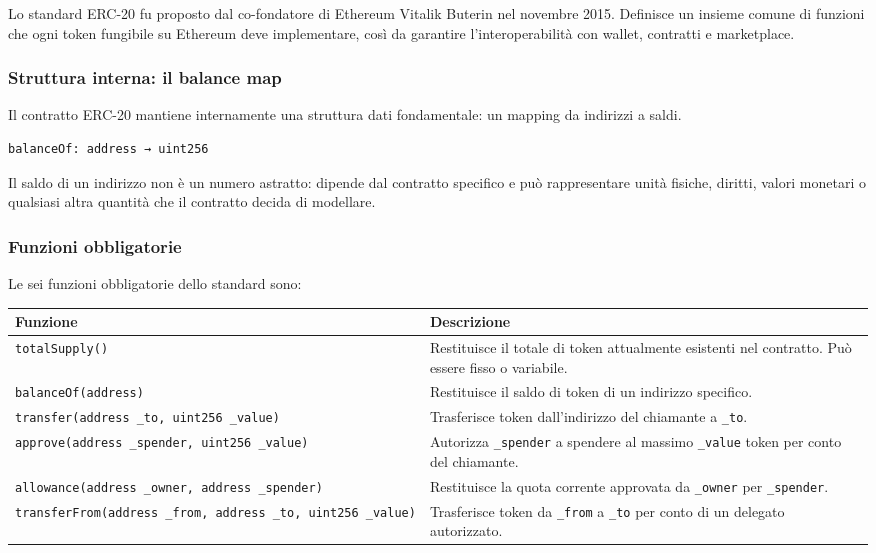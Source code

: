 \documentclass[
  italian,
  openany]{book}
\newcounter{none} %
\begin{document}
Lo standard ERC-20 fu proposto dal co-fondatore di Ethereum Vitalik
Buterin nel novembre 2015. Definisce un insieme comune di funzioni che
ogni token fungibile su Ethereum deve implementare, così da garantire
l'interoperabilità con wallet, contratti e marketplace.

\subsubsection{Struttura interna: il balance
map}\label{struttura-interna-il-balance-map}

Il contratto ERC-20 mantiene internamente una struttura dati
fondamentale: un mapping da indirizzi a saldi.

\begin{verbatim}
balanceOf: address → uint256
\end{verbatim}

Il saldo di un indirizzo non è un numero astratto: dipende dal contratto
specifico e può rappresentare unità fisiche, diritti, valori monetari o
qualsiasi altra quantità che il contratto decida di modellare.

\subsubsection{Funzioni obbligatorie}\label{funzioni-obbligatorie}

Le sei funzioni obbligatorie dello standard sono:

{\def\LTcaptype{none} %
\begin{longtable}[]{@{}
  >{\raggedright\arraybackslash}p{}
  >{\raggedright\arraybackslash}p{}@{}}
\toprule\noalign{}
\begin{minipage}[b]{\linewidth}\raggedright
Funzione
\end{minipage} & \begin{minipage}[b]{\linewidth}\raggedright
Descrizione
\end{minipage} \\
\midrule\noalign{}
\endhead
\bottomrule\noalign{}
\endlastfoot
\texttt{totalSupply()} & Restituisce il totale di token attualmente
esistenti nel contratto. Può essere fisso o variabile. \\
\texttt{balanceOf(address)} & Restituisce il saldo di token di un
indirizzo specifico. \\
\texttt{transfer(address\ \_to,\ uint256\ \_value)} & Trasferisce token
dall'indirizzo del chiamante a \texttt{\_to}. \\
\texttt{approve(address\ \_spender,\ uint256\ \_value)} & Autorizza
\texttt{\_spender} a spendere al massimo \texttt{\_value} token per
conto del chiamante. \\
\texttt{allowance(address\ \_owner,\ address\ \_spender)} & Restituisce
la quota corrente approvata da \texttt{\_owner} per
\texttt{\_spender}. \\
\texttt{transferFrom(address\ \_from,\ address\ \_to,\ uint256\ \_value)}
& Trasferisce token da \texttt{\_from} a \texttt{\_to} per conto di un
delegato autorizzato. \\
\end{longtable}
}
\end{document}
